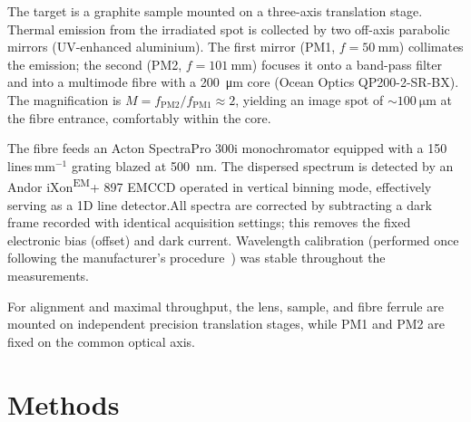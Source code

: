 \documentclass[
	parskip=half,
	a4paper,
]{scrarticle}
\begin{document}
The target is a graphite sample mounted on a three-axis translation stage. Thermal emission from the irradiated spot is collected by two off-axis parabolic mirrors (UV-enhanced aluminium). The first mirror (PM1, \(f=\SI{50}{\milli\metre}\)) collimates the emission; the second (PM2, \(f=\SI{101}{\milli\metre}\)) focuses it onto a band-pass filter and into a multimode fibre with a \SI{200}{\micro\metre} core (Ocean Optics QP200-2-SR-BX). The magnification is \(M = f_{\mathrm{PM2}}/f_{\mathrm{PM1}} \approx 2\), yielding an image spot of \(\sim\SI{100}{\micro\metre}\) at the fibre entrance, comfortably within the core.

The fibre feeds an Acton SpectraPro 300i monochromator equipped with a 150\,lines\,mm\(^{-1}\) grating blazed at \SI{500}{\nano\metre}. The dispersed spectrum is detected by an Andor iXon\textsuperscript{EM}+ 897 EMCCD operated in vertical binning mode, effectively serving as a 1D line detector.All spectra are corrected by subtracting a dark frame recorded with identical acquisition settings; this removes the fixed electronic bias (offset) and dark current.
Wavelength calibration (performed once following the manufacturer’s procedure~\cite{roob_thermal_2025}) was stable throughout the measurements.

For alignment and maximal throughput, the lens, sample, and fibre ferrule are mounted on independent precision translation stages, while PM1 and PM2 are fixed on the common optical axis. 

\section{Methods}
\end{document}

